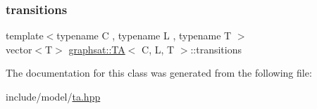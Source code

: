 \subsubsection{\texorpdfstring{transitions}{transitions}}
{\footnotesize\ttfamily template$<$typename C , typename L , typename T $>$ \\
vector$<$T$>$ \mbox{\hyperlink{classgraphsat_1_1_t_a}{graphsat\+::\+TA}}$<$ C, L, T $>$\+::transitions\hspace{0.3cm}{\ttfamily [private]}}



The documentation for this class was generated from the following file\+:\begin{DoxyCompactItemize}
\item 
include/model/\mbox{\hyperlink{ta_8hpp}{ta.\+hpp}}\end{DoxyCompactItemize}
